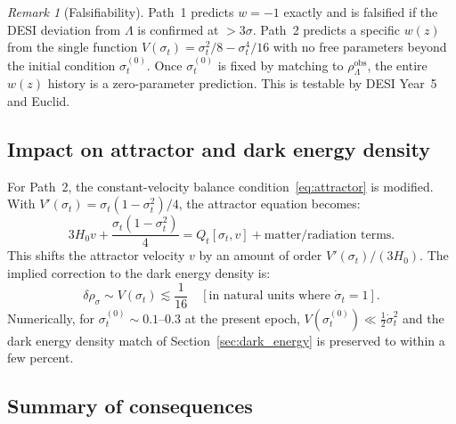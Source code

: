 \documentclass[11pt,a4paper]{article}
\theoremstyle{plain}
\theoremstyle{definition}
\theoremstyle{remark}
\newtheorem{remark}{Remark}[section]
\newcommand{\dotv}{\dot\sigma_t}
\begin{document}
\begin{remark}[Falsifiability]
Path~1 predicts $w = -1$ exactly and is falsified if the DESI
deviation from $\Lambda$ is confirmed at $> 3\sigma$.
Path~2 predicts a specific $w(z)$ from the single function $V(\sigma_t)
= \sigma_t^2/8 - \sigma_t^4/16$ with no free parameters beyond the
initial condition $\sigma_t^{(0)}$.  Once $\sigma_t^{(0)}$ is fixed
by matching to $\rho_\Lambda^{\mathrm{obs}}$, the entire $w(z)$ history
is a zero-parameter prediction.  This is testable by DESI Year~5
and Euclid.
\end{remark}

\subsection{Impact on attractor and dark energy density}

For Path~2, the constant-velocity balance condition~\eqref{eq:attractor}
is modified.  With $V'(\sigma_t) = \sigma_t(1-\sigma_t^2)/4$, the
attractor equation becomes:
\begin{equation}
  3H_0 v + \frac{\sigma_t(1-\sigma_t^2)}{4} = Q_t[\sigma_t, v]
  + \text{matter/radiation terms.}
  \label{eq:attractor_modified}
\end{equation}
This shifts the attractor velocity $v$ by an amount of order
$V'(\sigma_t)/(3H_0)$.  The implied correction to the dark energy
density is:
\begin{equation}
  \delta\rho_\sigma \sim V(\sigma_t) \lesssim \frac{1}{16}
  \quad [\text{in natural units where } \dotv = 1].
\end{equation}
Numerically, for $\sigma_t^{(0)} \sim 0.1$--$0.3$ at the present
epoch, $V(\sigma_t^{(0)}) \ll \tfrac{1}{2}\dotv^2$ and the dark energy
density match of Section~\ref{sec:dark_energy} is preserved to within
a few percent.

\subsection{Summary of consequences}
\end{document}
